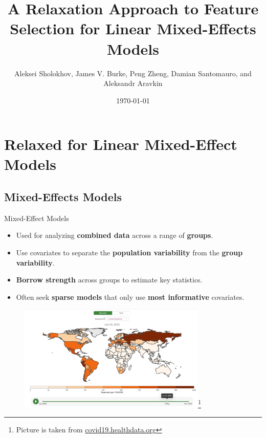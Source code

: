 \documentclass[8pt]{beamer}
\title{A Relaxation Approach to Feature Selection \newline for Linear Mixed-Effects Models}
\date{\today}
\author{Aleksei Sholokhov, James V. Burke, Peng Zheng, Damian Santomauro, and Aleksandr Aravkin}
\begin{document}
\maketitle

\section{Relaxed for Linear Mixed-Effect Models}
\subsection{Mixed-Effects Models}
\begin{frame}{Mixed-Effect Models}

\begin{itemize}
	\item Used for analyzing \textbf{combined data} across a range of \textbf{groups}.
	\item Use covariates to separate the \textbf{population variability} from the \textbf{group variability}.
	\item \textbf{Borrow strength} across groups to estimate key statistics. %
	\item Often seek \textbf{sparse models} that only use \textbf{most informative} covariates. 
\end{itemize}

\begin{figure}
	\centering
	\includegraphics[width=0.8\textwidth]{Figures/ihme_predictions.png}\footnote{Picture is taken from \href{covid19.healthdata.org}{covid19.healthdata.org} }
\end{figure}

\end{frame}
\end{document}
